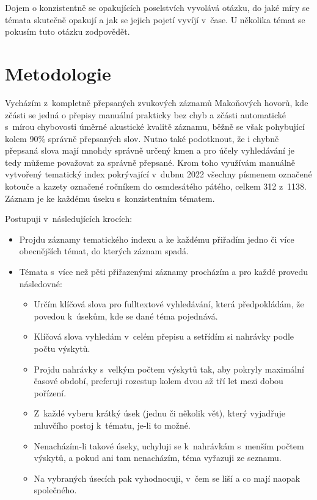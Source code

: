 Dojem o konzistentně se opakujících poselstvích vyvolává otázku, do jaké míry se
témata skutečně opakují a jak se jejich pojetí vyvíjí v~čase. U několika témat
se pokusím tuto otázku zodpovědět.

\section{Metodologie}

Vycházím z~kompletně přepsaných zvukových záznamů Makoňových hovorů, kde zčásti
se jedná o přepisy manuální prakticky bez chyb a zčásti automatické s~mírou
chybovosti úměrné akustické kvalitě záznamu, běžně se však pohybující kolem 90\%
správně přepsaných slov. Nutno také podotknout, že i chybně přepsaná slova mají
mnohdy správně určený kmen a pro účely vyhledávání je tedy můžeme považovat za
správně přepsané. Krom toho využívám manuálně vytvořený tematický index
pokrývající v~dubnu 2022 všechny písmenem označené kotouče a kazety označené
ročníkem do osmdesátého pátého, celkem 312 z~1138. Záznam je ke každému úseku
s~konzistentním tématem.

Postupuji v~následujících krocích:
\begin{itemize}
\item{
Projdu záznamy tematického indexu a ke každému přiřadím jedno či více
obecnějších témat, do kterých záznam spadá.
}
\item{
Témata s~více než pěti přiřazenými záznamy procházím a pro každé provedu
následovné:
\begin{itemize}
\item{
Určím klíčová slova pro fulltextové vyhledávání, která předpokládám, že povedou
k~úsekům, kde se dané téma pojednává.
}
\item{
Klíčová slova vyhledám v~celém přepisu a setřídím si nahrávky podle počtu
výskytů.
}
\item{
Projdu nahrávky s~velkým počtem výskytů tak, aby pokryly maximální časové
období, preferuji rozestup kolem dvou až tří let mezi dobou pořízení.
}
\item{
Z~každé vyberu krátký úsek (jednu či několik vět), který vyjadřuje mluvčího
postoj k~tématu, je-li to možné.
}
\item{
Nenacházím-li takové úseky, uchyluji se k~nahrávkám s~menším počtem výskytů, a
pokud ani tam nenacházím, téma vyřazuji ze seznamu.
}
\item{
Na vybraných úsecích pak vyhodnocuji, v~čem se liší a co mají naopak
společného.
}
\end{itemize}
}
\end{itemize}

